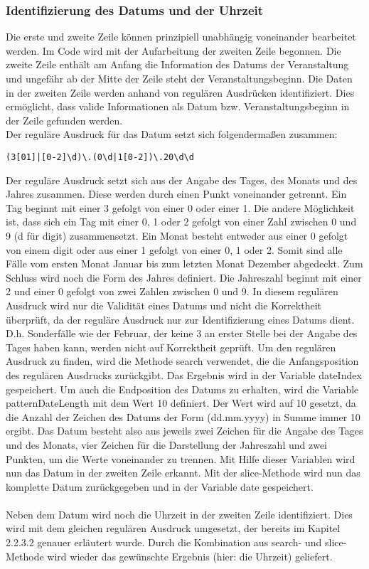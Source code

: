 \subsubsection{Identifizierung des Datums und der Uhrzeit}
Die erste und zweite Zeile können prinzipiell unabhängig voneinander bearbeitet werden. Im Code wird mit der Aufarbeitung der zweiten Zeile begonnen. Die zweite Zeile enthält am Anfang die Information des Datums der Veranstaltung und ungefähr ab der Mitte der Zeile steht der Veranstaltungsbeginn. Die Daten in der zweiten Zeile werden anhand von regulären Ausdrücken identifiziert. Dies ermöglicht, dass valide Informationen als Datum bzw. Veranstaltungsbeginn in der Zeile gefunden werden.\\
Der reguläre Ausdruck für das Datum setzt sich folgendermaßen zusammen:
\begin{verbatim}
(3[01]|[0-2]\d)\.(0\d|1[0-2])\.20\d\d
\end{verbatim}
Der reguläre Ausdruck setzt sich aus der Angabe des Tages, des Monats und des Jahres zusammen. Diese werden durch einen Punkt voneinander getrennt. Ein Tag beginnt mit einer 3 gefolgt von einer 0 oder einer 1. Die andere Möglichkeit ist, dass sich ein Tag mit einer 0, 1 oder 2 gefolgt von einer Zahl zwischen 0 und 9 (d für digit) zusammensetzt. Ein Monat besteht entweder aus einer 0 gefolgt von einem digit oder aus einer 1 gefolgt von einer 0, 1 oder 2. Somit sind alle Fälle vom ersten Monat Januar bis zum letzten Monat Dezember abgedeckt. Zum Schluss wird noch die Form des Jahres definiert. Die Jahreszahl beginnt mit einer 2 und einer 0 gefolgt von zwei Zahlen zwischen 0 und 9. 
In diesem regulären Ausdruck wird nur die Validität eines Datums und nicht die Korrektheit überprüft, da der reguläre Ausdruck nur zur Identifizierung eines Datums dient. D.h. Sonderfälle wie der Februar, der keine 3 an erster Stelle bei der Angabe des Tages haben kann, werden nicht auf Korrektheit geprüft.
Um den regulären Ausdruck zu finden, wird die Methode search verwendet, die die Anfangsposition des regulären Ausdrucks zurückgibt. Das Ergebnis wird in der Variable dateIndex gespeichert. Um auch die Endposition des Datums zu erhalten, wird die Variable patternDateLength mit dem Wert 10 definiert. Der Wert wird auf 10 gesetzt, da die Anzahl der Zeichen des Datums der Form (dd.mm.yyyy) in Summe immer 10 ergibt. Das Datum besteht also aus jeweils zwei Zeichen für die Angabe des Tages und des Monats, vier Zeichen für die Darstellung der Jahreszahl und zwei Punkten, um die Werte voneinander zu trennen. Mit Hilfe dieser Variablen wird nun das Datum in der zweiten Zeile erkannt. Mit der slice-Methode wird nun das komplette Datum zurückgegeben und in der Variable date gespeichert.\\
\\
Neben dem Datum wird noch die Uhrzeit in der zweiten Zeile identifiziert. Dies wird mit dem gleichen regulären Ausdruck umgesetzt, der bereits im Kapitel 2.2.3.2 genauer erläutert wurde. Durch die Kombination aus search- und slice-Methode wird wieder das gewünschte Ergebnis (hier: die Uhrzeit) geliefert. 

